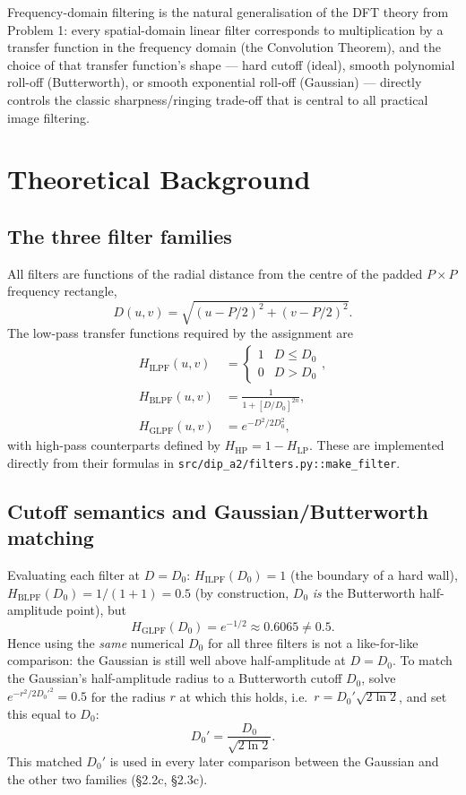 \documentclass[11pt]{article}
\begin{document}
Frequency-domain filtering is the natural generalisation of the DFT theory from Problem 1: every
spatial-domain linear filter corresponds to multiplication by a transfer function in the frequency
domain (the Convolution Theorem), and the choice of that transfer function's shape --- hard cutoff
(ideal), smooth polynomial roll-off (Butterworth), or smooth exponential roll-off (Gaussian) ---
directly controls the classic sharpness/ringing trade-off that is central to all practical image
filtering.

\section{Theoretical Background}

\subsection{The three filter families}

All filters are functions of the radial distance from the centre of the padded $P\times P$
frequency rectangle,
\begin{equation}
  D(u,v) = \sqrt{(u-P/2)^2 + (v-P/2)^2}.
\end{equation}
The low-pass transfer functions required by the assignment are
\begin{align}
  H_{\text{ILPF}}(u,v) &= \begin{cases} 1 & D\le D_0 \\ 0 & D>D_0 \end{cases}, \\
  H_{\text{BLPF}}(u,v) &= \frac{1}{1+\left[D/D_0\right]^{2n}}, \\
  H_{\text{GLPF}}(u,v) &= e^{-D^2/2D_0^2},
\end{align}
with high-pass counterparts defined by $H_{\text{HP}} = 1-H_{\text{LP}}$. These are implemented
directly from their formulas in \texttt{src/dip\_a2/filters.py::make\_filter}.

\subsection{Cutoff semantics and Gaussian/Butterworth matching}

Evaluating each filter at $D=D_0$: $H_{\text{ILPF}}(D_0)=1$ (the boundary of a hard wall),
$H_{\text{BLPF}}(D_0) = 1/(1+1) = 0.5$ (by construction, $D_0$ \emph{is} the Butterworth
half-amplitude point), but
\begin{equation}
  H_{\text{GLPF}}(D_0) = e^{-1/2} \approx 0.6065 \ne 0.5.
\end{equation}
Hence using the \emph{same} numerical $D_0$ for all three filters is not a like-for-like
comparison: the Gaussian is still well above half-amplitude at $D=D_0$. To match the Gaussian's
half-amplitude radius to a Butterworth cutoff $D_0$, solve $e^{-r^2/2D_0'^2}=0.5$ for the radius
$r$ at which this holds, i.e.\ $r = D_0'\sqrt{2\ln 2}$, and set this equal to $D_0$:
\begin{equation}
  D_0' = \frac{D_0}{\sqrt{2\ln 2}}.
\end{equation}
This matched $D_0'$ is used in every later comparison between the Gaussian and the other two
families (\S2.2c, \S2.3c).
\end{document}
